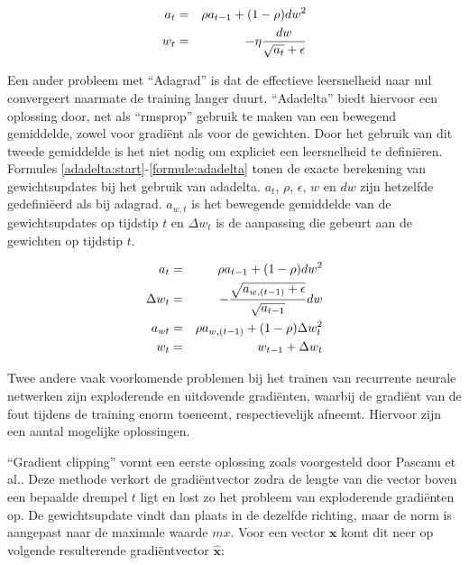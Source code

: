 \begin{eqnarray}
\vspace{-3mm}
    \label{rmsprop:start}
    a_t & = & \rho  a_{t-1} + (1 - \rho)dw^2 \\
    w_t & = &  - \eta \frac{dw}{\sqrt{a_t} + \epsilon}
    \label{formule:rmsprop}
    \vspace{-3mm}
\end{eqnarray}

Een ander probleem met ``Adagrad'' is dat de effectieve leersnelheid naar nul convergeert naarmate de training langer duurt. ``Adadelta''\cite{Zeiler2012} biedt hiervoor een oplossing door, net als ``rmsprop'' gebruik te maken van een bewegend gemiddelde, zowel voor gradi\"ent als voor de gewichten. Door het gebruik van dit tweede gemiddelde is het niet nodig om expliciet een leersnelheid te defini\"eren. Formules \eqref{adadelta:start}-\eqref{formule:adadelta} tonen de exacte berekening van gewichtsupdates bij het gebruik van adadelta. $a_t$, $\rho$, $\epsilon$, $w$ en $dw$ zijn hetzelfde gedefini\"eerd als bij adagrad. $a_{w,t}$ is het bewegende gemiddelde van de gewichtsupdates op tijdstip $t$ en $\Delta w_t$ is de aanpassing die gebeurt aan de gewichten op tijdstip $t$.

\begin{eqnarray}
\vspace{-3mm}
    \label{adadelta:start}
    a_t & = & \rho  a_{t-1} + (1 - \rho)dw^2 \\
    \Delta w_t & = & - \frac{\sqrt{a_{w,(t-1)} + \epsilon}}{\sqrt{a_{t-1}}}dw \\
    a_{wt} & = & \rho  a_{w,(t-1)} + (1 - \rho)\Delta w_t^2 \\
    w_t & = & w_{t-1} + \Delta w_t
    \label{formule:adadelta}
    \vspace{-3mm}
\end{eqnarray}


Twee andere vaak voorkomende problemen bij het trainen van recurrente neurale netwerken zijn exploderende en uitdovende gradi\"enten, waarbij de gradi\"ent van de fout tijdens de training enorm toeneemt, respectievelijk afneemt. Hiervoor zijn een aantal mogelijke oplossingen.

``Gradient clipping'' vormt een eerste oplossing zoals voorgesteld door Pascanu et al.\cite{Pascanu2012}. Deze methode verkort de gradi\"entvector zodra de lengte van die vector boven een bepaalde drempel $t$ ligt en lost zo het probleem van exploderende gradi\"enten op. De gewichtsupdate vindt dan plaats in de dezelfde richting, maar de norm is aangepast naar de maximale waarde $mx$. Voor een vector $\mathbf{x}$ komt dit neer op volgende resulterende gradi\"entvector $\mathbf{\hat{x}}$:

